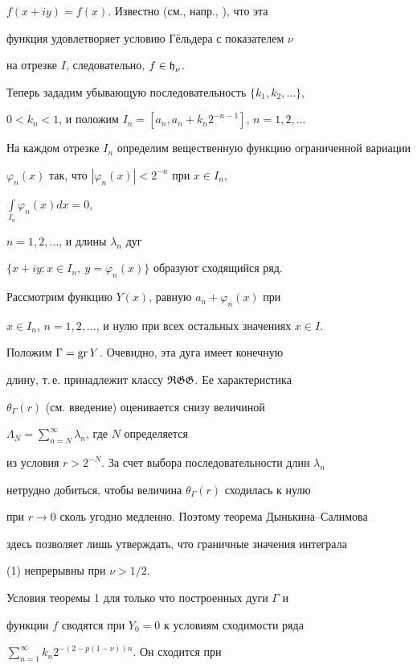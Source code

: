 $f(x+iy) = f(x)$. Известно (см., напр., \cite{Dy}), что эта


функция удовлетворяет условию Г\"ельдера с показателем $\nu$


на отрезке $I$, следовательно, $f\in\operatorname{\frak h}_{\nu}$.





Теперь зададим убывающую последовательность $\{k_1, k_2, \dotsc\}$,


$0<k_n<1$, и положим $I_n = [a_n, a_n + k_{n}2^{-n-1}]$, $n=1,2,\dotsc$


На каждом отрезке $I_n$ определим вещественную функцию ограниченной вариации


$\varphi_{n}(x)$ так, что $|\varphi_{n}(x)|<2^{-n}$ при $x\in I_n$,


$\int\limits_{I_n}{\varphi_{n}(x)dx} = 0$,


$n=1,2,\dotsc$, и длины $\lambda_n$ дуг


$\{x+iy: x\in I_n,\ y=\varphi_{n}(x)\}$ образуют сходящийся ряд.


Рассмотрим функцию $Y(x)$, равную $a_{n}+\varphi_{n}(x)$ при


$x \in I_n$, $n=1,2,\dotsc$, и нулю при всех остальных значениях $x\in I$.


Положим $\Gamma = \operatorname{gr} Y$. Очевидно, эта дуга имеет конечную


длину, т.\,е. принадлежит классу $\operatorname{\frak R\frak G\frak G}$. Ее характеристика


$\theta_{\Gamma}(r)$ (см. введение) оценивается снизу величиной


$\Lambda_{N}=\sum\limits_{n=N}^{\infty}{\lambda_n}$, где $N$ определяется


из условия $r>2^{-N}$. За счет выбора последовательности длин $\lambda_n$


нетрудно добиться, чтобы величина $\theta_{\Gamma}(r)$ сходилась к нулю


при $r\to 0$ сколь угодно медленно. Поэтому теорема Дынькина--Салимова


здесь позволяет лишь утверждать, что граничные значения интеграла


(1) непрерывны при $\nu > 1/2$.





Условия теоремы 1 для только что построенных дуги $\Gamma$ и


функции $f$ сводятся при $Y_0 = 0$ к условиям сходимости ряда


$\sum\limits_{n=1}^{\infty}{k_{n}2^{-(2-p(1-\nu))n}}$. Он сходится при


